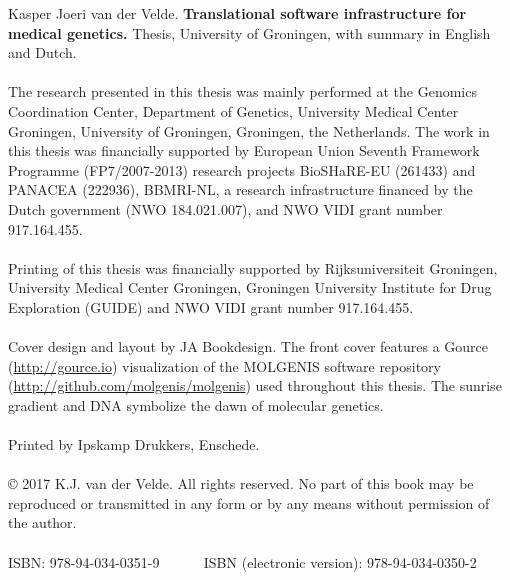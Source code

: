 {\small
\noindent
Kasper Joeri van der Velde. \textbf{Translational software infrastructure for medical genetics.} Thesis, University of Groningen, with summary in English and Dutch.
\\~\\
The research presented in this thesis was mainly performed at the Genomics Coordination Center, Department of Genetics, University Medical Center Groningen, University of Groningen, Groningen, the Netherlands. The work in this thesis was financially supported by European Union Seventh Framework Programme (FP7/2007-2013) research projects BioSHaRE-EU (261433) and PANACEA (222936), BBMRI-NL, a research infrastructure financed by the Dutch government (NWO 184.021.007), and NWO VIDI grant number 917.164.455.
\\~\\
Printing of this thesis was financially supported by Rijksuniversiteit Groningen, University Medical Center Groningen, Groningen University Institute for Drug Exploration (GUIDE) and NWO VIDI grant number 917.164.455.
\\~\\
Cover design and layout by JA Bookdesign.
The front cover features a Gource (\url{http://gource.io}) visualization of the MOLGENIS software repository (\url{http://github.com/molgenis/molgenis}) used throughout this thesis. The sunrise gradient and DNA symbolize the dawn of molecular genetics.
\\~\\
Printed by Ipskamp Drukkers, Enschede.\\
\\
© 2017 K.J. van der Velde. All rights reserved. No part of this book may be reproduced or transmitted in any form or by any means without permission of the author.\\
\\
ISBN: 978-94-034-0351-9 \mbox{~~~~~} ISBN (electronic version): 978-94-034-0350-2
}

